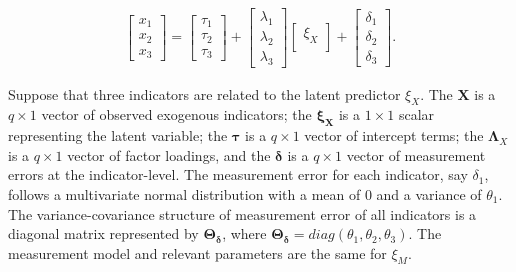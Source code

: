 \documentclass[
  man]{apa7}
\begin{document}
\begin{align}
    \begin{bmatrix}
        x_{1} \\
        x_{2} \\ 
        x_{3}
    \end{bmatrix} =
    \begin{bmatrix}
        \tau_{1} \\
        \tau_{2} \\ 
        \tau_{3}
    \end{bmatrix} +
    \begin{bmatrix}
        \lambda_{1} \\
        \lambda_{2} \\ 
        \lambda_{3}
    \end{bmatrix}
    \begin{bmatrix}
        \xi_{X} \\
    \end{bmatrix} +
    \begin{bmatrix}
        \delta_{1} \\
        \delta_{2} \\ 
        \delta_{3}
    \end{bmatrix}.
\end{align}

Suppose that three indicators are related to the latent predictor \(\xi_{X}\). The \(\textbf{X}\) is a \(q \times 1\) vector of observed exogenous indicators; the \(\boldsymbol{\xi_{X}}\) is a \(1 \times 1\) scalar representing the latent variable; the \(\boldsymbol{{\tau}}\) is a \(q \times 1\) vector of intercept terms; the \(\boldsymbol{\Lambda}_{X}\) is a \(q \times 1\) vector of factor loadings, and the \(\boldsymbol{\delta}\) is a \(q \times 1\) vector of measurement errors at the indicator-level. The measurement error for each indicator, say \(\delta_{1}\), follows a multivariate normal distribution with a mean of 0 and a variance of \(\theta_{1}\). The variance-covariance structure of measurement error of all indicators is a diagonal matrix represented by \(\mathbf{\Theta_{\delta}}\), where \(\mathbf{\Theta_{\delta}} = diag(\theta_{1}, \theta_{2}, \theta_{3})\). The measurement model and relevant parameters are the same for \(\xi_{M}\).
\end{document}
